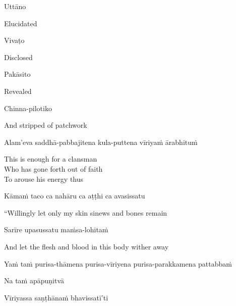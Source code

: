 Uttāno

\begin{english}
  Elucidated
\end{english}

Vivaṭo

\begin{english}
  Disclosed
\end{english}

Pakāsito

\begin{english}
  Revealed
\end{english}

Chinna-pilotiko

\begin{english}
  And stripped of patchwork
\end{english}

Alam'eva saddhā-pabbajitena kula-puttena vīriyaṁ ārabhituṁ

\begin{english-verses}
  This is enough for a clansman\\
  Who has gone forth out of faith\\
  To arouse his energy thus
\end{english-verses}

Kāmaṁ taco ca nahāru ca aṭṭhi ca avasissatu

\begin{english}
  ``Willingly let only my skin  sinews  and bones remain
\end{english}

Sarīre upasussatu maṁsa-lohitaṁ

\begin{english}
  And let the flesh and blood in this body wither away
\end{english}

\begin{pali-hang}
  Yaṁ taṁ purisa-thāmena purisa-vīriyena purisa-parakkamena pattabbaṁ\\
\end{pali-hang}
\begin{pali-hangtogether}
  Na taṁ apāpuṇitvā\\
\end{pali-hangtogether}
\begin{pali-hangtogether}
  Vīriyassa saṇṭhānaṁ bhavissatī'ti
\end{pali-hangtogether}

